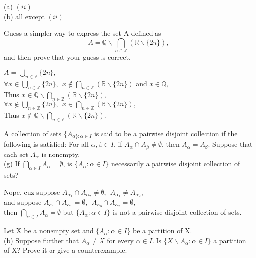 \documentclass[11pt, a4paper, UTF8]{ctexart}
\begin{document}
\begin{revision}
    (a) $(ii)$\\
    (b) all except $(ii)$
\end{revision}
\begin{problem}[UD: 8.9]
    Guess a simpler way to express the set A defined as\\
    $$A = \mathbb{Q}\backslash\bigcap_{n \in \mathbb{Z}}(\mathbb{R}\backslash\{2n\}),$$
and then prove that your guess is correct.
\end{problem}

\begin{revision}
    $A = \bigcup_{n \in \mathbb{Z}}\{2n\},$\\
    $\forall x \in \bigcup_{n \in \mathbb{Z}}\{2n\},~~
    x \notin \bigcap_{n \in \mathbb{Z}}(\mathbb{R}\backslash\{2n\})$ and 
    $x \in \mathbb{Q},$\\
    Thus $x \in \mathbb{Q}\backslash\bigcap_{n \in \mathbb{Z}}(\mathbb{R}\backslash\{2n\}),$\\
    $\forall x \notin \bigcup_{n \in \mathbb{Z}}\{2n\},~~x \in \bigcap_{n \in \mathbb{Z}}(\mathbb{R}\backslash\{2n\}),$\\
    Thus $x \notin \mathbb{Q}\backslash\bigcap_{n \in \mathbb{Z}}(\mathbb{R}\backslash\{2n\}).$
\end{revision}
\begin{problem}[UD: 8.11]
    A collection of sets $\{A_{\alpha\}: \alpha \in I}$ is said to be a pairwise disjoint collection if the following is satisfied: 
    For all $\alpha,\beta \in I$, if $A_{\alpha} \cap A_{\beta} \neq \emptyset$, then $A_{\alpha} = A_{\beta}$. 
    Suppose that each set $A_{\alpha}$ is nonempty.\\
    (g) If $\bigcap_{\alpha \in I}A_{\alpha} = \emptyset$, is $\{A_{\alpha}:\alpha \in I\}$ 
    necessarily a pairwise disjoint collection of sets?
\end{problem}

\begin{revision}
    Nope, cuz suppose $A_{\alpha_{1}} \cap A_{\alpha_{2}} \neq \emptyset,~~A_{\alpha_{1}} \neq A_{\alpha_{2}}$,\\
    and suppose $A_{\alpha_{3}} \cap A_{\alpha_{1}} = \emptyset,~~A_{\alpha_{3}} \cap A_{\alpha_{2}} = \emptyset$,\\
    then $\bigcap_{\alpha \in I}A_{\alpha} = \emptyset$ but $\{A_{\alpha}:\alpha \in I\}$ is not a 
    pairwise disjoint collection of sets.
\end{revision}
\begin{problem}[UD: 11.9]
    Let X be a nonempty set and $\{A_{\alpha}: \alpha \in I\}$ be a partition of X.\\
    (b) Suppose further that $A_{\alpha} \neq X$ for every $\alpha \in I$. 
    Is $\{X \backslash A_{\alpha}: \alpha \in I\}$ a partition of X? Prove it or give a counterexample.
\end{problem}
\end{document}
